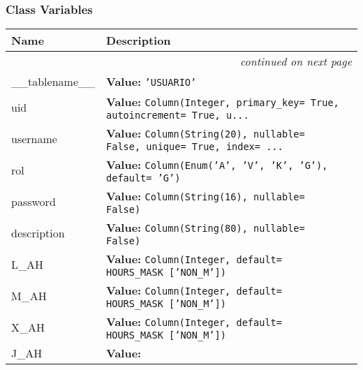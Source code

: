 
  \subsubsection{Class Variables}

    \vspace{-1cm}
\hspace{\varindent}\begin{longtable}{|p{\varnamewidth}|p{\vardescrwidth}|l}
\cline{1-2}
\cline{1-2} \centering \textbf{Name} & \centering \textbf{Description}& \\
\cline{1-2}
\endhead\cline{1-2}\multicolumn{3}{r}{\small\textit{continued on next page}}\\\endfoot\cline{1-2}
\endlastfoot\raggedright \_\-\_\-t\-a\-b\-l\-e\-n\-a\-m\-e\-\_\-\_\- & \raggedright \textbf{Value:} 
{\tt \texttt{'}\texttt{USUARIO}\texttt{'}}&\\
\cline{1-2}
\raggedright u\-i\-d\- & \raggedright \textbf{Value:} 
{\tt Column(Integer, primary\_key= True, autoincrement= True, u\texttt{...}}&\\
\cline{1-2}
\raggedright u\-s\-e\-r\-n\-a\-m\-e\- & \raggedright \textbf{Value:} 
{\tt Column(String(20), nullable= False, unique= True, index= \texttt{...}}&\\
\cline{1-2}
\raggedright r\-o\-l\- & \raggedright \textbf{Value:} 
{\tt Column(Enum('A', 'V', 'K', 'G'), default= 'G')}&\\
\cline{1-2}
\raggedright p\-a\-s\-s\-w\-o\-r\-d\- & \raggedright \textbf{Value:} 
{\tt Column(String(16), nullable= False)}&\\
\cline{1-2}
\raggedright d\-e\-s\-c\-r\-i\-p\-t\-i\-o\-n\- & \raggedright \textbf{Value:} 
{\tt Column(String(80), nullable= False)}&\\
\cline{1-2}
\raggedright L\-\_\-A\-H\- & \raggedright \textbf{Value:} 
{\tt Column(Integer, default= HOURS\_MASK ['NON\_M'])}&\\
\cline{1-2}
\raggedright M\-\_\-A\-H\- & \raggedright \textbf{Value:} 
{\tt Column(Integer, default= HOURS\_MASK ['NON\_M'])}&\\
\cline{1-2}
\raggedright X\-\_\-A\-H\- & \raggedright \textbf{Value:} 
{\tt Column(Integer, default= HOURS\_MASK ['NON\_M'])}&\\
\cline{1-2}
\raggedright J\-\_\-A\-H\- & \raggedright \textbf{Value:} 

\end{longtable}

